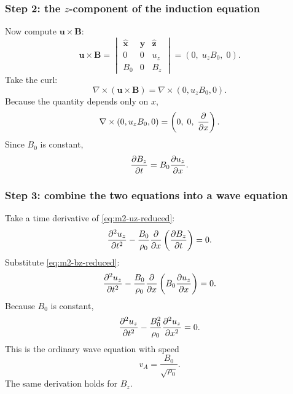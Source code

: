 \documentclass[11pt]{article}
\newcommand{\uvec}{\mathbf{u}}
\newcommand{\Bvec}{\mathbf{B}}
\newcommand{\xhat}{\hat{\mathbf{x}}}
\newcommand{\yhat}{\hat{\mathbf{y}}}
\newcommand{\zhat}{\hat{\mathbf{z}}}
\begin{document}
\subsubsection{Step 2: the $z$-component of the induction equation}
Now compute $\uvec\times\Bvec$:
\begin{equation}
\uvec\times\Bvec
=
\begin{vmatrix}
\xhat & \yhat & \zhat \\
0 & 0 & u_z \\
B_0 & 0 & B_z
\end{vmatrix}
=
(0,\;u_z B_0,\;0).
\label{eq:m2-cross}
\end{equation}
Take the curl:
\begin{equation}
\nabla\times(\uvec\times\Bvec)
=
\nabla\times(0,u_z B_0,0).
\end{equation}
Because the quantity depends only on $x$,
\begin{equation}
\nabla\times(0,u_z B_0,0)
=
\left(0,\;0,\;\pdv{}{x}(u_z B_0)\right).
\end{equation}
Since $B_0$ is constant,
\begin{equation}
\pdv{B_z}{t} = B_0 \pdv{u_z}{x}.
\label{eq:m2-bz-reduced}
\end{equation}

\subsubsection{Step 3: combine the two equations into a wave equation}
Take a time derivative of \eqref{eq:m2-uz-reduced}:
\begin{equation}
\pdv[2]{u_z}{t} - \frac{B_0}{\rho_0}\pdv{}{x}\left(\pdv{B_z}{t}\right)=0.
\end{equation}
Substitute \eqref{eq:m2-bz-reduced}:
\begin{equation}
\pdv[2]{u_z}{t} - \frac{B_0}{\rho_0}\pdv{}{x}\left(B_0 \pdv{u_z}{x}\right)=0.
\end{equation}
Because $B_0$ is constant,
\begin{equation}
\pdv[2]{u_z}{t} - \frac{B_0^2}{\rho_0}\pdv[2]{u_z}{x}=0.
\label{eq:m2-wave-u}
\end{equation}
This is the ordinary wave equation with speed
\begin{equation}
v_A = \frac{B_0}{\sqrt{\rho_0}}.
\label{eq:m2-va}
\end{equation}
The same derivation holds for $B_z$.
\end{document}
